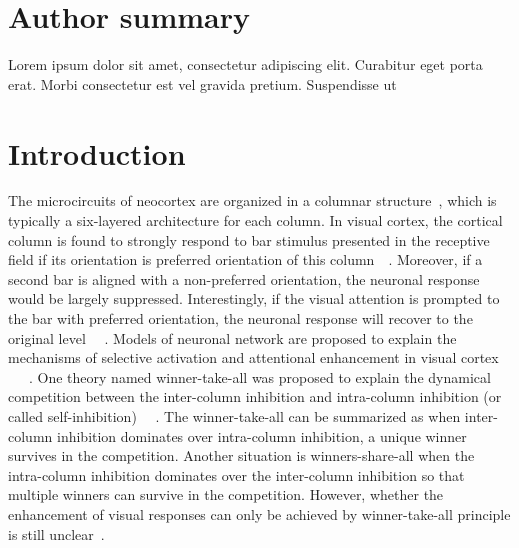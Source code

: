 \documentclass[10pt,letterpaper]{article}
\begin{document}
\section*{Author summary}
Lorem ipsum dolor sit amet, consectetur adipiscing elit. Curabitur eget porta erat. Morbi consectetur est vel gravida pretium. Suspendisse ut

\linenumbers

\section*{Introduction}
The microcircuits of neocortex are organized in a columnar structure~\cite{Mountcastle1957}, which is typically a six-layered architecture for each column. In visual cortex, the cortical column is found to strongly respond to bar stimulus presented in the receptive field if its orientation is preferred orientation of this column~\cite{hubel1959}~\cite{reynolds1999}. Moreover, if a second bar is aligned with a non-preferred orientation, the neuronal response would be largely suppressed. Interestingly, if the visual attention is prompted to the bar with preferred orientation, the neuronal response will recover to the original level ~\cite{reynolds1999}~\cite{luck1997}. Models of neuronal network are proposed to explain the mechanisms of selective activation and attentional enhancement in visual cortex ~\cite{reynolds1999}~\cite{boynton2005}~\cite{buia2008}. One theory named winner-take-all was proposed to explain the dynamical competition between the inter-column inhibition and intra-column inhibition (or called self-inhibition) ~\cite{fukai1997}~\cite{wagatsuma2011}. The winner-take-all can be summarized as when inter-column inhibition dominates over intra-column inhibition, a unique winner survives in the competition. Another situation is winners-share-all when the intra-column inhibition dominates over the inter-column inhibition so that multiple winners can survive in the competition. However, whether the enhancement of visual responses can only be achieved by winner-take-all principle is still unclear~\cite{dieter2016}. 
\end{document}
